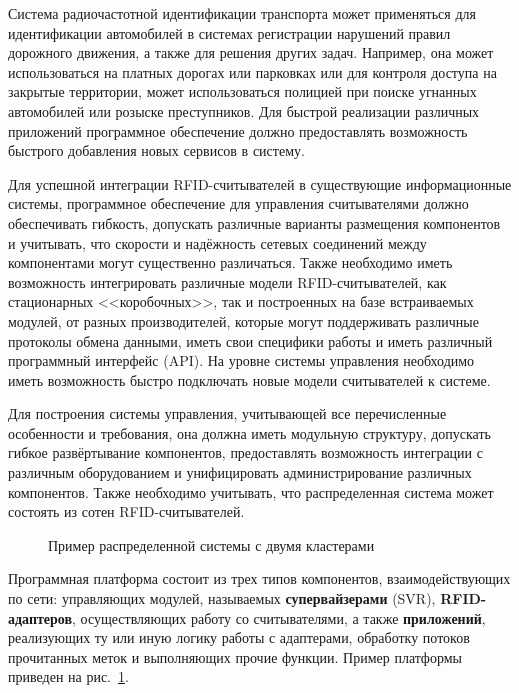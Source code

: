 Система радиочастотной идентификации транспорта может применяться для идентификации автомобилей в системах регистрации нарушений правил дорожного движения, а также для решения других задач. Например, она может использоваться на платных дорогах или парковках или для контроля доступа на закрытые территории, может использоваться полицией при поиске угнанных автомобилей или розыске преступников. Для быстрой реализации различных приложений программное обеспечение должно предоставлять возможность быстрого добавления новых сервисов в систему.

Для успешной интеграции RFID-считывателей в существующие информационные системы, программное обеспечение для управления считывателями должно обеспечивать гибкость, допускать различные варианты размещения компонентов и учитывать, что скорости и надёжность сетевых соединений между компонентами могут существенно различаться. Также необходимо иметь возможность интегрировать различные модели RFID-считывателей, как стационарных <<коробочных>>, так и построенных на базе встраиваемых модулей, от разных производителей, которые могут поддерживать различные протоколы обмена данными, иметь свои специфики работы и иметь различный программный интерфейс (API). На уровне системы управления необходимо иметь возможность быстро подключать новые модели считывателей к системе.

Для построения системы управления, учитывающей все перечисленные особенности и требования, она должна иметь модульную структуру, допускать гибкое развёртывание компонентов, предоставлять возможность интеграции с различным оборудованием и унифицировать администрирование различных компонентов. Также необходимо учитывать, что распределенная система может состоять из сотен RFID-считывателей.

\begin{figure}[ht]
  \caption{Пример распределенной системы с двумя кластерами}
  \label{fig:ch5_system_example}
\end{figure}

Программная платформа состоит из трех типов компонентов, взаимодействующих по сети: управляющих модулей, называемых \textbf{супервайзерами} (SVR), \textbf{RFID-адаптеров}, осуществляющих работу со считывателями, а также \textbf{приложений}, реализующих ту или иную логику работы с адаптерами, обработку потоков прочитанных меток и выполняющих прочие функции. Пример платформы приведен на рис.~\ref{fig:ch5_system_example}.

